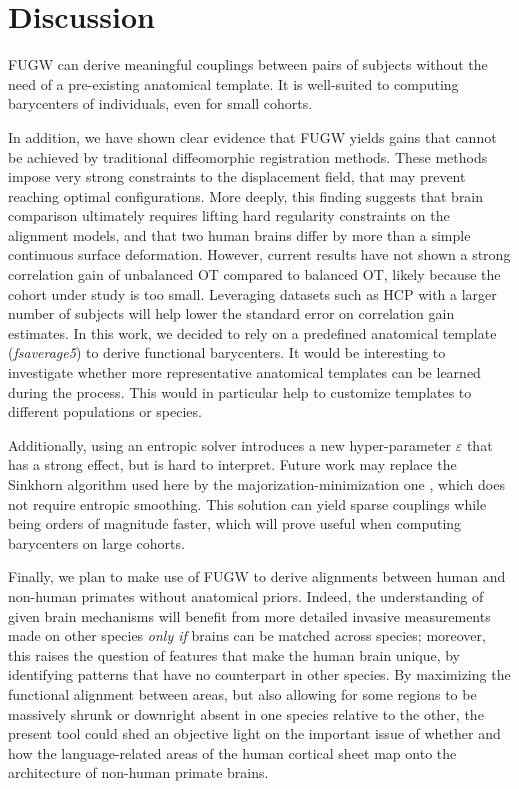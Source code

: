 \section{Discussion}

FUGW can derive meaningful couplings between pairs of subjects without
the need of a pre-existing anatomical template. It is well-suited to computing
barycenters of individuals, even for small cohorts.

In addition, we have shown clear evidence that FUGW yields gains that cannot be achieved
by traditional diffeomorphic registration methods.
These methods impose very strong constraints to the displacement field,
that may prevent reaching optimal configurations.
More deeply, this finding suggests that brain comparison ultimately requires
lifting hard regularity constraints on the alignment models,
and that two human brains differ by more than a simple continuous surface deformation.
However, current results have not shown a strong correlation gain of
unbalanced OT compared to balanced OT, likely because the cohort under study is too small.
Leveraging datasets such as HCP \citep{hcpdata} with a larger number of subjects
will help lower the standard error on correlation gain estimates.
In this work, we decided to rely on a predefined anatomical template (\emph{fsaverage5})
to derive functional barycenters.
It would be interesting to investigate whether more representative anatomical templates
can be learned during the process.
This would in particular help to customize templates to different populations or species.

Additionally, using an entropic solver introduces a new hyper-parameter $\varepsilon$
that has a strong effect, but is hard to interpret.
Future work may replace the Sinkhorn algorithm \citep{Sejourne19}
used here by the majorization-minimization one \citep{Chapel20},
which does not require entropic smoothing. This solution can yield sparse couplings
while being orders of magnitude faster, which will prove useful when computing barycenters
on large cohorts.

Finally, we plan to make use of FUGW to derive alignments between human and
non-human primates without anatomical priors. Indeed, the understanding of given brain mechanisms
will benefit from more detailed invasive measurements made on other species \emph{only if}
brains can be matched across species; moreover, this  raises the question of features
that make the human brain unique, by identifying patterns that have no counterpart in other species.
By maximizing the functional alignment between areas, but also allowing for some regions
to be massively shrunk or downright absent in one species relative to the other,
the present tool could shed an objective light on the important issue of whether
and how the language-related areas of the human cortical sheet map onto
the architecture of non-human primate brains.

\vfill